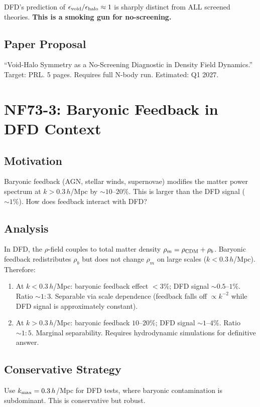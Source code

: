 \documentclass[11pt,a4paper]{article}
\begin{document}
DFD's prediction of $\epsilon_{\rm void}/\epsilon_{\rm halo} \approx 1$ is sharply distinct from ALL screened theories. \textbf{This is a smoking gun for no-screening.}

\subsection{Paper Proposal}
``Void-Halo Symmetry as a No-Screening Diagnostic in Density Field Dynamics.'' Target: PRL. 5 pages. Requires full N-body run. Estimated: Q1 2027.

\section{NF73-3: Baryonic Feedback in DFD Context}

\subsection{Motivation}
Baryonic feedback (AGN, stellar winds, supernovae) modifies the matter power spectrum at $k > 0.3\,h$/Mpc by $\sim 10$--$20\%$. This is larger than the DFD signal ($\sim 1\%$). How does feedback interact with DFD?

\subsection{Analysis}
In DFD, the $\rho$-field couples to total matter density $\rho_m = \rho_{\rm CDM} + \rho_b$. Baryonic feedback redistributes $\rho_b$ but does not change $\rho_m$ on large scales ($k < 0.3\,h$/Mpc). Therefore:
\begin{enumerate}[nosep]
\item At $k < 0.3\,h$/Mpc: baryonic feedback effect $< 3\%$; DFD signal $\sim 0.5$--$1\%$. Ratio $\sim 1:3$. Separable via scale dependence (feedback falls off $\propto k^{-2}$ while DFD signal is approximately constant).
\item At $k > 0.3\,h$/Mpc: baryonic feedback $10$--$20\%$; DFD signal $\sim 1$--$4\%$. Ratio $\sim 1:5$. Marginal separability. Requires hydrodynamic simulations for definitive answer.
\end{enumerate}

\subsection{Conservative Strategy}
Use $k_{\rm max} = 0.3\,h$/Mpc for DFD tests, where baryonic contamination is subdominant. This is conservative but robust.
\end{document}
